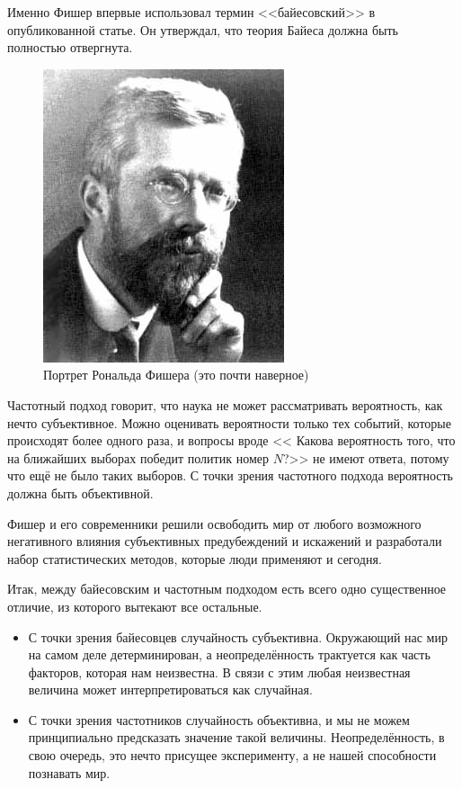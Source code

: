 \documentclass[12pt, a4paper, oneside]{extreport}
\theoremstyle{plain}              %
\theoremstyle{definition}         %
\begin{document}
Именно Фишер впервые использовал термин <<байесовский>> в опубликованной статье. Он утверждал, что теория Байеса должна быть полностью отвергнута. 
\begin{figure}
	\centering \includegraphics[width=0.8\linewidth]{images/Fischer.jpg}
	\caption{Портрет Рональда Фишера (это почти наверное)}
\end{figure} 
Частотный подход говорит, что наука не может рассматривать вероятность, как нечто субъективное. Можно оценивать вероятности только тех событий, которые происходят более одного раза, и вопросы вроде << Какова вероятность того, что на ближайших выборах победит политик номер $N$?>> не имеют ответа, потому что ещё не было таких выборов. С точки зрения частотного подхода вероятность должна быть объективной.

Фишер и его современники решили освободить мир от любого возможного негативного влияния субъективных предубеждений и искажений и разработали набор статистических методов, которые люди применяют и сегодня.

Итак, между байесовским и частотным подходом есть всего одно существенное отличие, из которого вытекают все остальные.

\begin{itemize}
\item С точки зрения байесовцев случайность субъективна. Окружающий нас мир на самом деле детерминирован, а неопределённость трактуется как часть факторов, которая нам неизвестна. В связи с этим любая неизвестная величина может интерпретироваться как случайная.

\item С точки зрения частотников случайность объективна, и мы не можем принципиально предсказать значение такой величины. Неопределённость, в свою очередь, это нечто присущее эксперименту, а не нашей способности познавать мир.
\end{itemize}
\end{document}
